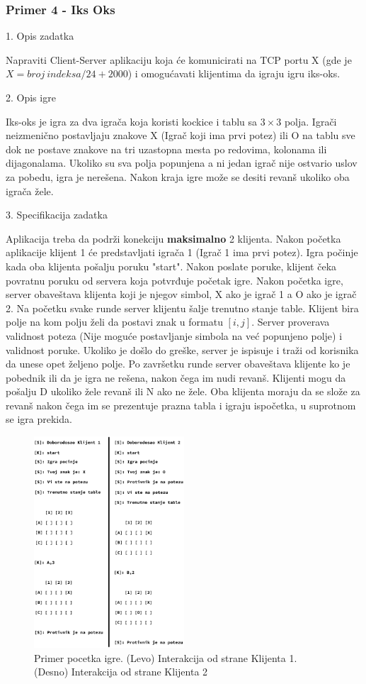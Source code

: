 \subsubsection{Primer 4 - Iks Oks}

\large{1. Opis zadatka}
\normalsize

Napraviti Client-Server aplikaciju koja će komunicirati na TCP portu X (gde je $X = broj\ indeksa/24 + 2000$) i omogućavati klijentima da igraju igru iks-oks.

\large{2. Opis igre}
\normalsize

Iks-oks je igra za dva igrača koja koristi kockice i tablu sa $3\times3$ polja. Igrači neizmenično postavljaju znakove X (Igrač koji ima prvi potez) ili O na tablu sve dok ne postave znakove na tri uzastopna mesta po redovima, kolonama ili dijagonalama. Ukoliko su sva polja popunjena a ni jedan igrač nije ostvario uslov za pobedu, igra je nerešena. Nakon kraja igre može se desiti revanš ukoliko oba igrača žele.

\large{3. Specifikacija zadatka}
\normalsize

Aplikacija treba da podrži konekciju \textbf{maksimalno} 2 klijenta. Nakon početka aplikacije klijent 1 će predstavljati igrača 1 (Igrač 1 ima prvi potez). Igra počinje kada oba klijenta pošalju poruku "start". Nakon poslate poruke, klijent čeka povratnu poruku od servera koja potvrđuje početak igre. Nakon početka igre, server obaveštava klijenta koji je njegov simbol, X ako je igrač 1 a O ako je igrač 2. Na početku svake runde server klijentu šalje trenutno stanje table. Klijent bira polje na kom polju želi da postavi znak u formatu $[i,j]$. Server proverava validnost poteza (Nije moguće postavljanje simbola na već popunjeno polje) i validnost poruke. Ukoliko je došlo do greške, server je ispisuje i traži od korisnika da unese opet željeno polje. Po završetku runde server obaveštava klijente ko je pobednik ili da je igra ne rešena, nakon čega im nudi revanš. Klijenti mogu da pošalju D ukoliko žele revanš ili N ako ne žele. Oba klijenta moraju da se slože za revanš nakon čega im se prezentuje prazna tabla i igraju ispočetka, u suprotnom se igra prekida.

\begin{figure}[H]
    \centering
    \includegraphics[width=0.5\textwidth]{Slike/XO/XO_Pocetak.png}
    \caption*{Primer pocetka igre. (Levo) Interakcija od strane Klijenta 1. (Desno) Interakcija od strane Klijenta 2}
    \label{fig:xo_pocetak}
\end{figure}